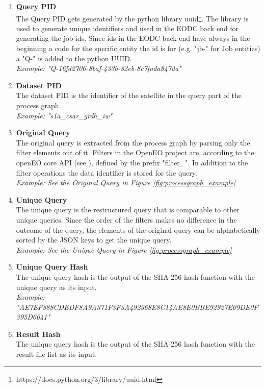 \documentclass[draft,final]{vutinfth} %
\begin{document}
\begin{enumerate}
	\item \textbf{Query PID} \\
	The Query PID gets generated by the python library uuid\footnote{https://docs.python.org/3/library/uuid.html}. The library is used to generate unique identifiers and used in the EODC back end for generating the job ids. Since ids in the EODC back end have always in the beginning a code for the specific entity the id is for (e.g. "jb-" for Job entities) a "Q-" is added to the python UUID. \\
	\textit{Example: "Q-16fd2706-8baf-433b-82eb-8c7fada847da"}
	\item \textbf{Dataset PID} \\
	The dataset PID is the identifier of the satellite in the query part of the process graph. \\
	\textit{Example: "s1a\_csar\_grdh\_iw"}	    	
	\item\textbf{Original Query} \\
	The original query is extracted from the process graph by parsing only the filter elements out of it. Filters in the OpenEO project are, according to the openEO core API (see \cite{openeo_api_desc}), defined by the prefix "filter\_". In addition to the filter operations the data identifier is stored for the query. \\
	\textit{Example: See the Original Query in Figure \ref{fig:processgraph_example}}	 
	\item \textbf{Unique Query} \\
	The unique query is the restructured query that is comparable to other unique queries. Since the order of the filters makes no difference in the outcome of the query, the elements of the original query can be alphabetically sorted by the JSON keys to get the unique query. \\
	\textit{Example: See the Unique Query in Figure \ref{fig:processgraph_example}}	  	 	
	\item \textbf{Unique Query Hash} \\
	The unique query hash is the output of the SHA-256 hash function with the unique query as its input. \\
	\textit{Example: "AE7EF888CDEDF8A9A371F3F3A492368E8C14AE8E0BBE92927E09DE0F395D6041"} 
	\item \textbf{Result Hash} \\
	The unique query hash is the output of the SHA-256 hash function with the result file list as its input. \\

\end{enumerate}
\end{document}
